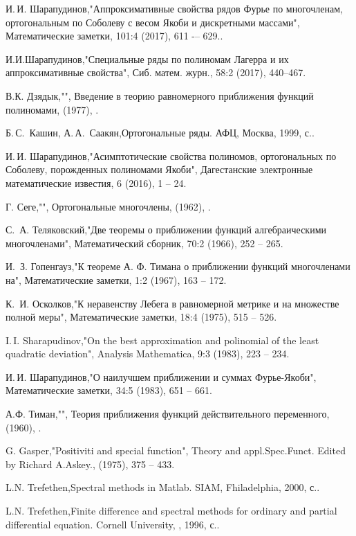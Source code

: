 \begin{thebibliography}{99}
И.\,И. Шарапудинов,"Аппроксимативные свойства рядов Фурье по многочленам, ортогональным по Соболеву с весом Якоби и дискретными массами", Математические заметки, 101:4 (2017), 611 -– 629..


И.И.Шарапудинов,"Специальные ряды по полиномам Лагерра и их аппроксимативные свойства", Сиб. матем. журн., 58:2 (2017), 440–467.


В.К. Дзядык,"", Введение в теорию равномерного приближения функций полиномами,  (1977), .


Б.\,С.~Кашин, А.\,А.~Саакян,Ортогональные ряды. АФЦ, Москва, 1999,  с..


И.\,И. Шарапудинов,"Асимптотические свойства полиномов, ортогональных по Соболеву, порожденных полиномами Якоби", Дагестанские электронные математические известия, 6 (2016), 1 -- 24.


Г. Сеге,"", Ортогональные многочлены,  (1962), .


С.\, А. Теляковский,"Две теоремы о приближении функций алгебраическими многочленами", Математический сборник, 70:2 (1966), 252 -- 265.


И.\, З. Гопенгауз,"К теореме А. Ф. Тимана о приближении функций многочленами на", Математические  заметки, 1:2 (1967), 163 -- 172.


К.\, И. Осколков,"К неравенству Лебега в равномерной метрике и на множестве полной меры", Математические  заметки, 18:4 (1975), 515 -- 526.


I.\,I. Sharapudinov,"On the best approximation and polinomial of the least quadratic deviation", Analysis Mathematica, 9:3 (1983), 223 -- 234.


И.\,И. Шарапудинов,"О наилучшем приближении и суммах Фурье-Якоби", Математические заметки, 34:5 (1983), 651 -- 661.


А.Ф. Тиман,"", Теория приближения функций действительного переменного,  (1960), .


G. Gasper,"Positiviti and special function", Theory and appl.Spec.Funct. Edited by Richard A.Askey.,  (1975), 375 -- 433.


L.N. Trefethen,Spectral methods in Matlab. SIAM, Fhiladelphia, 2000,  с..


L.N. Trefethen,Finite difference and spectral methods for ordinary and partial differential equation. Cornell University, , 1996,  с..



\end{thebibliography}
